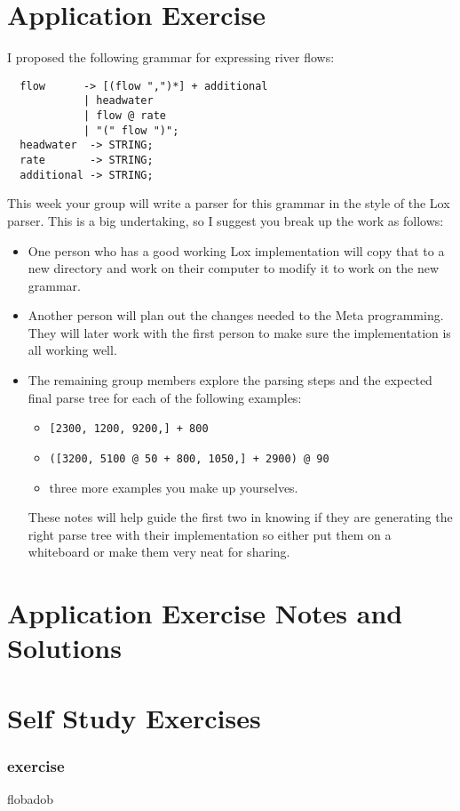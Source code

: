 \documentclass[twoside=false, DIV=14]{scrartcl}
\begin{document}
\newpage
\part*{Application Exercise}
I proposed the following grammar for expressing river flows:
\begin{lstlisting}
  flow      -> [(flow ",")*] + additional  
            | headwater 
            | flow @ rate
            | "(" flow ")";
  headwater  -> STRING;
  rate       -> STRING;
  additional -> STRING;
\end{lstlisting}

This week your group will write a parser for this grammar in the style of the Lox parser.  This is a big undertaking, so I suggest you break up the work as follows:
\begin{itemize}
\item One person who has a good working Lox implementation will copy that to a new directory and work on their computer to modify it to work on the new grammar.
\item Another person will plan out the changes needed to the Meta programming.  They will later work with the first person to make sure the implementation is all working well.
\item The remaining group members explore the parsing steps and the expected final parse tree for each of the following examples:
\begin{itemize}
  \item \lstinline|[2300, 1200, 9200,] + 800|
  \item \lstinline|([3200, 5100 @ 50 + 800, 1050,] + 2900) @ 90|
  \item three more examples you make up yourselves.
\end{itemize}  
These notes will help guide the first two in knowing if they are generating the right parse tree with their implementation so either put them on a whiteboard or make them very neat for sharing.
\end{itemize}

\newpage
\part*{Application Exercise Notes and Solutions}

\newpage
\part*{Self Study Exercises}
\section*{exercise}
flobadob
\end{document}
